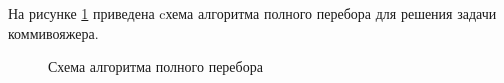 \clearpage
На рисунке \ref{fig:full_search} приведена cхема алгоритма полного перебора для решения задачи коммивояжера.

\clearpage
\begin{figure}[h!]
	
	
	\caption{Схема алгоритма полного перебора}
	
	\label{fig:full_search}
	
\end{figure}


